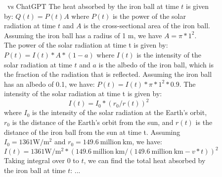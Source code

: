 \begin{figure}[H]
\begin{AIbox}{\DV \ vs ChatGPT}
{The heat absorbed by the iron ball at time $t$ is given by: $Q(t) = P(t) A$ where $P(t)$ is the power of the solar radiation at time $t$ and $A$ is the cross-sectional area of the iron ball. Assuming the iron ball has a radius of 1 m, we have $A = \pi * 1^2$.\\
The power of the solar radiation at time t is given by:
$P(t) = I(t) * A * (1 - a)$
where $I(t)$ is the intensity of the solar radiation at time $t$ and $a$ is the albedo of the iron ball, which is the fraction of the radiation that is reflected. Assuming the iron ball has an albedo of 0.1, we have:
$P(t) = I(t) * \pi * 1^2 * 0.9$.
The intensity of the solar radiation at time t is given by:
$$I(t) = I_0 * (r_0 / r(t))^2$$
where $I_0$ is the intensity of the solar radiation at the Earth's orbit, $r_0$ is the distance of the Earth's orbit from the sun, and $r(t)$ is the distance of the iron ball from the sun at time t. Assuming $I_0 = 1361  \mathrm{W}/\mathrm{m}^2$ and $r_0 = 149.6 \mathrm{\ million\ km}$, we have:
$$I(t) = 1361 \mathrm{W}/\mathrm{m}^2 * (149.6 \mathrm{\ million\ km} / (149.6 \mathrm{\ million\ km} - v * t))^2$$
Taking integral over $0$ to $t$, we can find the total heat absorbed by the iron ball at time $t$:
...
}\\


\end{AIbox}
\end{figure}
